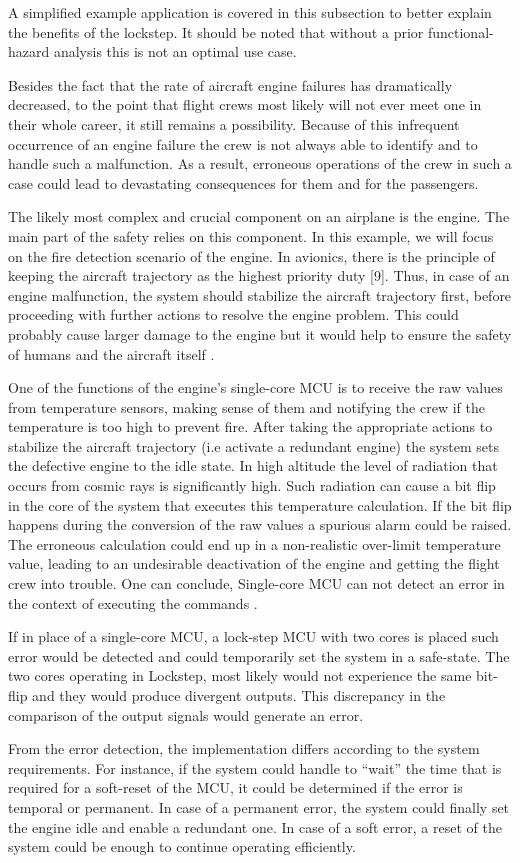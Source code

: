 A simplified example application is covered in this subsection to better explain the benefits of the lockstep. It should be noted that without a prior functional-hazard analysis this is not an optimal use case.

Besides the fact that the rate of aircraft engine failures has dramatically decreased,
to the point that flight crews most likely will not ever meet one in their
whole career, it still remains a possibility. Because of this infrequent occurrence
of an engine failure the crew is not always able to identify and to handle such a
malfunction. As a result, erroneous operations of the crew in such a case could
lead to devastating consequences for them and for the passengers.

The likely most complex and crucial component on an airplane is the engine. The main part of the safety relies on this component. In this example, we will focus on the fire detection scenario of the engine. 
In avionics, there is the principle of keeping the aircraft trajectory as
the highest priority duty [9]. Thus, in case of an engine malfunction, the system
should stabilize the aircraft trajectory first, before proceeding with further actions
to resolve the engine problem. This could probably cause larger damage to the
engine but it would help to ensure the safety of humans and the aircraft itself  \citep{lockstep_analysis}.

One of the functions of the engine's single-core MCU is to receive the raw values from temperature sensors, making sense of them and notifying the crew if the temperature is too high to prevent fire.  
After taking the appropriate actions to stabilize the aircraft trajectory (i.e activate a redundant engine) the system sets the defective engine to the idle state. In high
altitude the level of radiation that occurs from cosmic rays is significantly high.
Such radiation can cause a bit flip in the core of the
system that executes this temperature calculation. If the bit flip happens during the conversion of the raw values a spurious alarm could be raised. The erroneous calculation could end up in a non-realistic
over-limit temperature value, leading to an undesirable deactivation of the engine
and getting the flight crew into trouble. One can conclude, Single-core MCU can not detect an error in the context of executing the commands  \citep{lockstep_analysis}.

If in place of a single-core MCU, a lock-step MCU with two cores is placed such error would be detected and could temporarily set the system in a safe-state. The
two cores operating in Lockstep, most likely would not experience the same bit-flip
and they would produce divergent outputs. This discrepancy in the comparison of
the output signals would generate an error.


From the error detection, the implementation differs according to the system requirements. For instance, if the system could handle to “wait” the time that is required for a
soft-reset of the MCU, it could be determined if the error is temporal or permanent.
In case of a permanent error, the system could finally set the engine idle and enable
a redundant one. In case of a soft error, a reset of the system could be enough to
continue operating efficiently.


